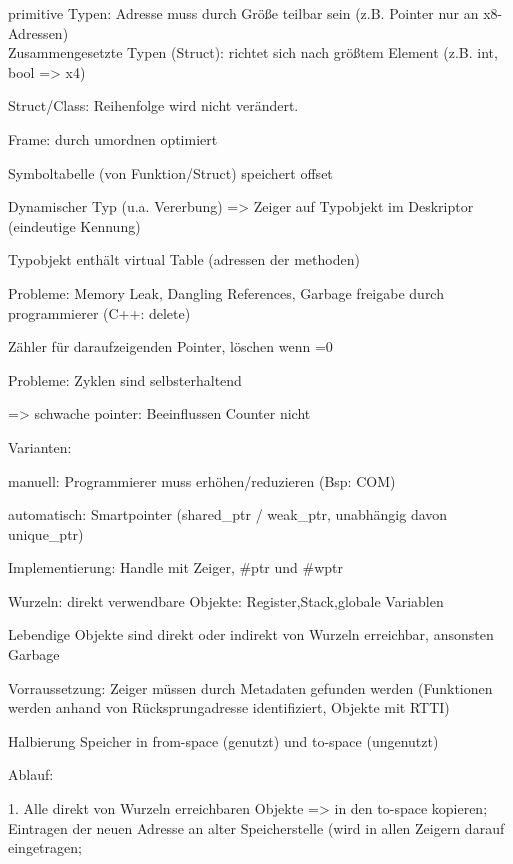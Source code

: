
 
primitive Typen: Adresse muss durch Größe teilbar sein (z.B. Pointer nur an x8-Adressen)\\
Zusammengesetzte Typen (Struct): richtet sich nach größtem Element (z.B. {int, bool} => x4)

Struct/Class: Reihenfolge wird nicht verändert.

Frame: durch umordnen optimiert


Symboltabelle (von Funktion/Struct) speichert offset

Dynamischer Typ (u.a. Vererbung) => Zeiger auf Typobjekt im Deskriptor (eindeutige Kennung)

Typobjekt enthält virtual Table (adressen der methoden)


Probleme: Memory Leak, Dangling References, Garbage
freigabe durch programmierer (C++: delete)

Zähler für daraufzeigenden Pointer, löschen wenn =0

Probleme: Zyklen sind selbsterhaltend 

=> schwache pointer: Beeinflussen Counter nicht

Varianten: 

manuell: Programmierer muss erhöhen/reduzieren (Bsp: COM)

automatisch: Smartpointer (shared\_ptr / weak\_ptr, unabhängig davon unique\_ptr)

Implementierung: 
Handle mit Zeiger, \#ptr und \#wptr

Wurzeln: direkt verwendbare Objekte: Register,Stack,globale Variablen

Lebendige Objekte sind direkt oder indirekt von Wurzeln erreichbar, ansonsten Garbage

Vorraussetzung: Zeiger müssen durch Metadaten gefunden werden (Funktionen werden anhand von Rücksprungadresse identifiziert, Objekte mit RTTI)

Halbierung Speicher in from-space (genutzt) und to-space (ungenutzt)

Ablauf: 

1. Alle direkt von Wurzeln erreichbaren Objekte => in den to-space kopieren; Eintragen der neuen Adresse an alter Speicherstelle (wird in allen Zeigern darauf eingetragen; 

